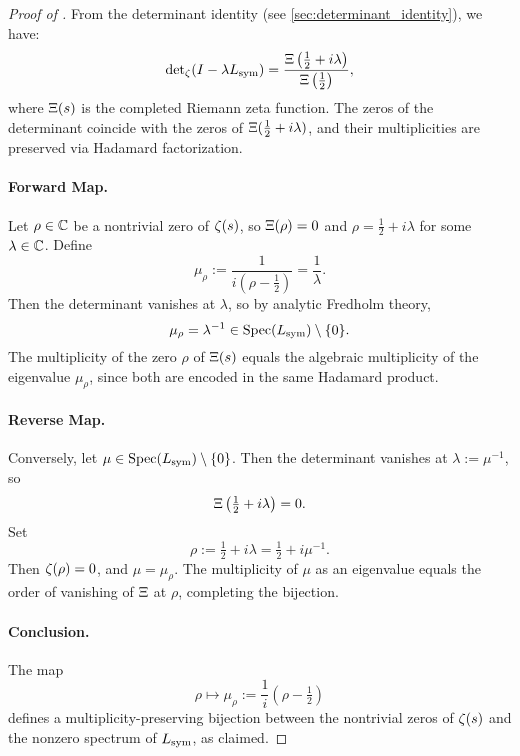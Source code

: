 \begin{proof}[Proof of ]
From the determinant identity (see \cref{sec:determinant_identity}), we have:
\[
\det\nolimits_\zeta(I - \lambda L_{\mathrm{sym}}) = \frac{\Xi\left( \tfrac{1}{2} + i\lambda \right)}{\Xi\left( \tfrac{1}{2} \right)},
\]
where \( \Xi(s) \) is the completed Riemann zeta function. The zeros of the determinant coincide with the zeros of \( \Xi(\tfrac{1}{2} + i\lambda) \), and their multiplicities are preserved via Hadamard factorization.

\paragraph{Forward Map.}
Let \( \rho \in \mathbb{C} \) be a nontrivial zero of \( \zeta(s) \), so \( \Xi(\rho) = 0 \) and \( \rho = \tfrac{1}{2} + i\lambda \) for some \( \lambda \in \mathbb{C} \). Define
\[
\mu_\rho := \frac{1}{i(\rho - \tfrac{1}{2})} = \frac{1}{\lambda}.
\]
Then the determinant vanishes at \( \lambda \), so by analytic Fredholm theory,
\[
\mu_\rho = \lambda^{-1} \in \operatorname{Spec}(L_{\mathrm{sym}}) \setminus \{0\}.
\]
The multiplicity of the zero \( \rho \) of \( \Xi(s) \) equals the algebraic multiplicity of the eigenvalue \( \mu_\rho \), since both are encoded in the same Hadamard product.

\paragraph{Reverse Map.}
Conversely, let \( \mu \in \operatorname{Spec}(L_{\mathrm{sym}}) \setminus \{0\} \). Then the determinant vanishes at \( \lambda := \mu^{-1} \), so
\[
\Xi\left(\tfrac{1}{2} + i\lambda\right) = 0.
\]
Set
\[
\rho := \tfrac{1}{2} + i\lambda = \tfrac{1}{2} + i \mu^{-1}.
\]
Then \( \zeta(\rho) = 0 \), and \( \mu = \mu_\rho \). The multiplicity of \( \mu \) as an eigenvalue equals the order of vanishing of \( \Xi \) at \( \rho \), completing the bijection.

\paragraph{Conclusion.}
The map
\[
\rho \mapsto \mu_\rho := \frac{1}{i}(\rho - \tfrac{1}{2})
\]
defines a multiplicity-preserving bijection between the nontrivial zeros of \( \zeta(s) \) and the nonzero spectrum of \( L_{\mathrm{sym}} \), as claimed.
\end{proof}
